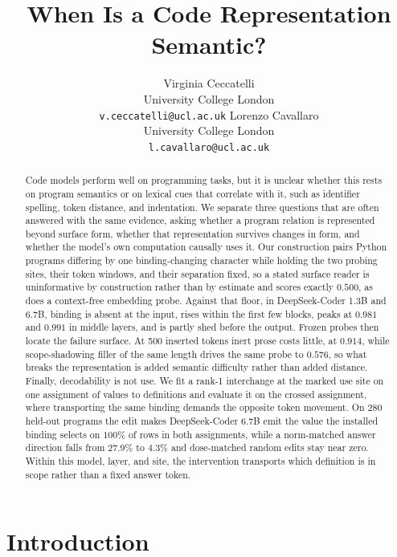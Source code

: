 \documentclass{article}
\title{When Is a Code Representation Semantic?}
\author{
  Virginia Ceccatelli \\
  University College London \\
  \texttt{v.ceccatelli@ucl.ac.uk}
  \And
  Lorenzo Cavallaro \\
  University College London \\
  \texttt{l.cavallaro@ucl.ac.uk}
}
\begin{document}
\maketitle
\begin{abstract}
Code models perform well on programming tasks, but it is unclear whether this rests on program semantics or on lexical cues that correlate with it, such as identifier spelling, token distance, and indentation. We separate three questions that are often answered with the same evidence, asking whether a program relation is represented beyond surface form, whether that representation survives changes in form, and whether the model's own computation causally uses it. Our construction pairs Python programs differing by one binding-changing character while holding the two probing sites, their token windows, and their separation fixed, so a stated surface reader is uninformative by construction rather than by estimate and scores exactly $0.500$, as does a context-free embedding probe. Against that floor, in DeepSeek-Coder 1.3B and 6.7B, binding is absent at the input, rises within the first few blocks, peaks at $0.981$ and $0.991$ in middle layers, and is partly shed before the output. Frozen probes then locate the failure surface. At 500 inserted tokens inert prose costs little, at $0.914$, while scope-shadowing filler of the same length drives the same probe to $0.576$, so what breaks the representation is added semantic difficulty rather than added distance. Finally, decodability is not use. We fit a rank-1 interchange at the marked use site on one assignment of values to definitions and evaluate it on the crossed assignment, where transporting the same binding demands the opposite token movement. On 280 held-out programs the edit makes DeepSeek-Coder 6.7B emit the value the installed binding selects on $100\%$ of rows in both assignments, while a norm-matched answer direction falls from $27.9\%$ to $4.3\%$ and dose-matched random edits stay near zero. Within this model, layer, and site, the intervention transports which definition is in scope rather than a fixed answer token.
\end{abstract}

\section{Introduction}
\label{sec:intro}
\end{document}

